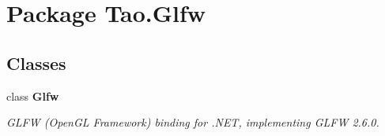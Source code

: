 \hypertarget{namespace_tao_1_1_glfw}{
\section{Package Tao.Glfw}
\label{namespace_tao_1_1_glfw}
}
\subsection*{Classes}
\begin{DoxyCompactItemize}
\item 
class {\bfseries Glfw}
\begin{DoxyCompactList}\small\item\em GLFW (OpenGL Framework) binding for .NET, implementing GLFW 2.6.0. \item\end{DoxyCompactList}\end{DoxyCompactItemize}
